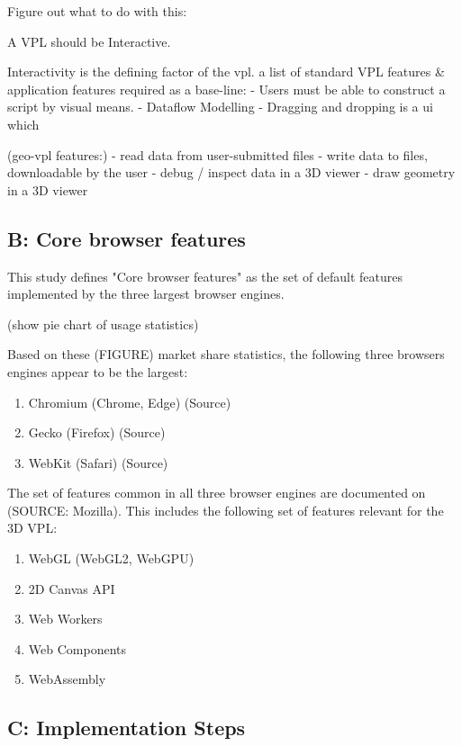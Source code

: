 \begin{note}
  Figure out what to do with this: 
 
  A VPL should be Interactive.

    Interactivity is the defining factor of the vpl. 
    a list of standard VPL features & application features required as a base-line:  
  - Users must be able to construct a script by visual means.
  - Dataflow Modelling
  - Dragging and dropping is a ui which

  (geo-vpl features:)
  - read data from user-submitted files
  - write data to files, downloadable by the user  
  - debug / inspect data in a 3D viewer
  - draw geometry in a 3D viewer

\end{note}

\subsection*{B: Core browser features}
This study defines "Core browser features" as the set of default features implemented by the three largest browser engines. 
\begin{note}
  (show pie chart of usage statistics)
\end{note}
Based on these (FIGURE) market share statistics, the following three browsers engines appear to be the largest:
\begin{enumerate}[-]
  \item Chromium (Chrome, Edge) (Source)
  \item Gecko (Firefox) (Source)
  \item WebKit (Safari) (Source)
\end{enumerate}

The set of features common in all three browser engines are documented on (SOURCE: Mozilla). 
This includes the following set of features relevant for the 3D VPL:
\begin{enumerate}[-]
  \item WebGL (WebGL2, WebGPU)
  \item 2D Canvas API
  \item Web Workers
  \item Web Components
  \item WebAssembly
\end{enumerate}

\subsection*{C: Implementation Steps}

